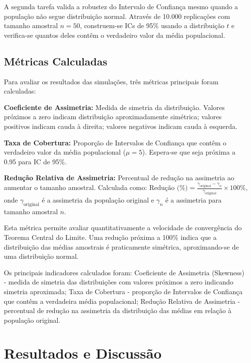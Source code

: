 \documentclass[12pt,a4paper]{article}
\begin{document}
A segunda tarefa valida a robustez do Intervalo de Confiança mesmo quando a população não segue distribuição normal. Através de 10.000 replicações com tamanho amostral $n = 50$, construem-se ICs de 95\% usando a distribuição $t$ e verifica-se quantos deles contêm o verdadeiro valor da média populacional.

\subsection{Métricas Calculadas}

Para avaliar os resultados das simulações, três métricas principais foram calculadas:

\textbf{Coeficiente de Assimetria:} Medida de simetria da distribuição. Valores próximos a zero indicam distribuição aproximadamente simétrica; valores positivos indicam cauda à direita; valores negativos indicam cauda à esquerda.

\textbf{Taxa de Cobertura:} Proporção de Intervalos de Confiança que contêm o verdadeiro valor da média populacional ($\mu = 5$). Espera-se que seja próxima a 0.95 para IC de 95\%.

\textbf{Redução Relativa de Assimetria:} Percentual de redução na assimetria ao aumentar o tamanho amostral. Calculada como: $\text{Redução (\%)} = \frac{\gamma_{\text{original}} - \gamma_n}{\gamma_{\text{original}}} \times 100\%$, onde $\gamma_{\text{original}}$ é a assimetria da população original e $\gamma_n$ é a assimetria para tamanho amostral $n$.

Esta métrica permite avaliar quantitativamente a velocidade de convergência do Teorema Central do Limite. Uma redução próxima a 100\% indica que a distribuição das médias amostrais é praticamente simétrica, aproximando-se de uma distribuição normal.

Os principais indicadores calculados foram: Coeficiente de Assimetria (Skewness) - medida de simetria das distribuições com valores próximos a zero indicando simetria aproximada; Taxa de Cobertura - proporção de Intervalos de Confiança que contêm a verdadeira média populacional; Redução Relativa de Assimetria - percentual de redução na assimetria da distribuição das médias em relação à população original.

\section{Resultados e Discussão}
\end{document}
